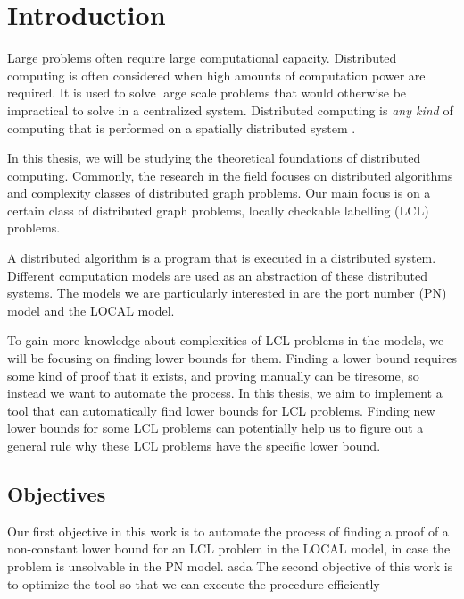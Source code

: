 
\section{Introduction}  \label{sec:introduction}

Large problems often require large computational capacity.
Distributed computing is often considered when high amounts of computation power are required.
It is used to solve large scale problems that would otherwise be impractical to solve in a centralized system.
Distributed computing is \emph{any kind} of computing that is performed on a spatially distributed system
\cite{DBLP:books/el/leeuwen90/LamportL90}.

In this thesis, we will be studying the theoretical foundations of distributed computing.
Commonly, the research in the field focuses on distributed algorithms and complexity classes of distributed graph problems.
Our main focus is on a certain class of distributed graph problems, locally checkable labelling (LCL) problems.

A distributed algorithm is a program that is executed in a distributed system.
Different computation models are used as an abstraction of these distributed systems.
The models we are particularly interested in are the port number (PN) model and the LOCAL model.


To gain more knowledge about complexities of LCL problems in the models, we will be focusing on finding lower bounds for them.
Finding a lower bound requires some kind of proof that it exists, and proving manually can be tiresome, so instead we want to automate the process.
In this thesis, we aim to implement a tool that can automatically find lower bounds for LCL problems.
Finding new lower bounds for some LCL problems can potentially help us to figure out a general rule why these LCL problems have the specific lower bound.

\subsection{Objectives}
Our first objective in this work is to automate the process of finding a proof of a non-constant lower bound for an LCL problem in the LOCAL model, in case the problem is unsolvable in the PN model.
asda 
The second objective of this work is to optimize the tool so that we can execute the procedure efficiently


